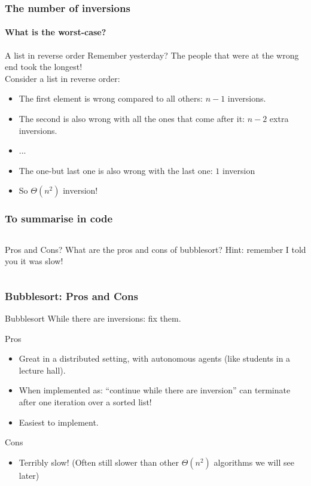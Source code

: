 \begin{frame}
	\frametitle{The number of inversions}
	\framesubtitle{What is the worst-case?}

	\begin{block}{A list in reverse order}
		Remember yesterday? The people that were at the wrong end took the longest!\\
		\pause
		Consider a list in reverse order:
		\begin{itemize}
			\item The first element is wrong compared to all others: $n-1$ inversions.
		\pause
			\item The second is also wrong with all the ones that come after it: $n-2$ extra inversions.
			\item ...
		\pause
			\item The one-but last one is also wrong with the last one: $1$ inversion
		\pause
			\item So $\Theta(n^2)$ inversion!
		\end{itemize}
	\end{block}
\end{frame}

\begin{frame}
	\frametitle{To summarise in code}
	\begin{columns}
	
		\begin{block}{Pros and Cons?}
			What are the pros and cons of bubblesort? Hint: remember I told you it was slow!
		\end{block}
	\end{columns}
\end{frame}

\begin{frame}
	\frametitle{Bubblesort: Pros and Cons}

		\begin{block}{Bubblesort}
			While there are inversions: fix them.
		\end{block}	
		\begin{block}{Pros}
			\begin{itemize}
				\item Great in a distributed setting, with autonomous agents (like students in a lecture hall).
				\item When implemented as: ``continue while there are inversion'' can terminate after one iteration over a
					sorted list! 
				\item Easiest to implement.
			\end{itemize}
		\end{block}	
		\begin{block}{Cons}
			\begin{itemize}
				\item Terribly slow! (Often still slower than other $\Theta(n^2)$ algorithms we will see later)
			\end{itemize}
		\end{block}	
\end{frame}

